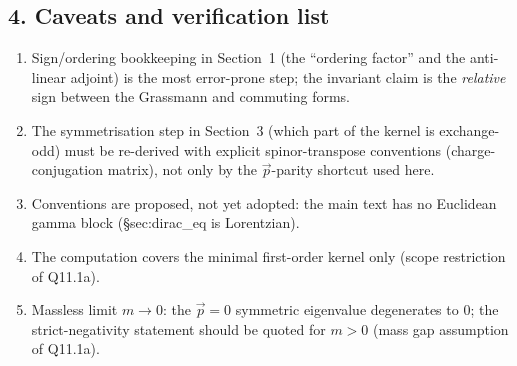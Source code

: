 \subsection*{4. Caveats and verification list}
\begin{enumerate}[label=(\alph*)]
  \item Sign/ordering bookkeeping in Section~1 (the ``ordering
    factor'' and the anti-linear adjoint) is the most
    error-prone step; the invariant claim is the \emph{relative}
    sign between the Grassmann and commuting forms.
  \item The symmetrisation step in Section~3 (which part of the
    kernel is exchange-odd) must be re-derived with explicit
    spinor-transpose conventions (charge-conjugation matrix), not
    only by the $\vec p$-parity shortcut used here.
  \item Conventions are proposed, not yet adopted: the main text
    has no Euclidean gamma block (\S sec:dirac\_eq is Lorentzian).
  \item The computation covers the minimal first-order kernel only
    (scope restriction of Q11.1a).
  \item Massless limit $m\to0$: the $\vec p=0$ symmetric eigenvalue
    degenerates to $0$; the strict-negativity statement should be
    quoted for $m>0$ (mass gap assumption of Q11.1a).
\end{enumerate}
